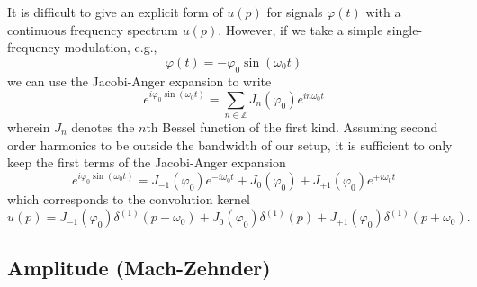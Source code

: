 It is difficult to give an explicit form of $u(p)$ for signals $\varphi(t)$ with a continuous frequency spectrum $u(p)$.
However, if we take a simple single-frequency modulation, e.g.,
\begin{equation}
	\varphi(t)
	=
	-
	\varphi_0
	\sin(\omega_0t)
\end{equation}
we can use the Jacobi-Anger expansion to write
\begin{equation}
	e^{i\varphi_0\sin(\omega_0t)}
	=
	\sum_{n\in\mathbb{Z}}
	J_n(\varphi_0)
	e^{in\omega_0 t}
\end{equation}
wherein $J_n$ denotes the $n$th Bessel function of the first kind.
Assuming second order harmonics to be outside the bandwidth of our setup, it is sufficient to only keep the first terms of the Jacobi-Anger expansion
\begin{equation}
	e^{i\varphi_0\sin(\omega_0t)}
	=
	J_{-1}(\varphi_0)
	e^{-i\omega_0t}
	+
	J_0(\varphi_0)
	+
	J_{+1}(\varphi_0)
	e^{+i\omega_0t}
\end{equation}
which corresponds to the convolution kernel
\begin{equation}
	u(p)
	=
	J_{-1}(\varphi_0)
	\delta^{(1)}(p-\omega_0)
	+
	J_0(\varphi_0)
	\delta^{(1)}(p)
	+
	J_{+1}(\varphi_0)
	\delta^{(1)}(p+\omega_0)
	.
\end{equation}

\subsection{Amplitude (Mach-Zehnder)}

